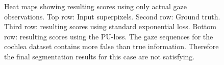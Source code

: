 \begin{figure}[ht]
	\caption{Heat maps showing resulting scores using only actual gaze observations. Top row: Input superpixels. Second row: Ground truth. Third row: resulting scores using standard exponential loss. Bottom row: resulting scores using the PU-loss. The gaze sequences for the cochlea dataset contains more false than true information. Therefore the final segmentation results for this case are not satisfying.}
	\label{fig:results-d8-gaze2}
\end{figure}
